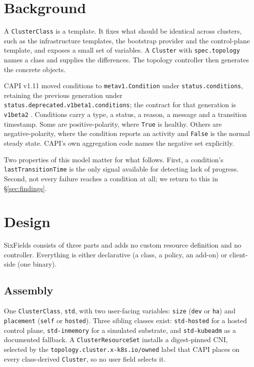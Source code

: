 \documentclass[conference]{IEEEtran}
\begin{document}
\section{Background}

A \texttt{ClusterClass} is a template. It fixes what should be identical across
clusters, such as the infrastructure templates, the bootstrap provider and the
control-plane template, and exposes a small set of variables. A \texttt{Cluster}
with \texttt{spec.topology} names a class and supplies the differences. The
topology controller then generates the concrete objects.

CAPI v1.11 moved conditions to \texttt{metav1.Condition} under
\texttt{status.conditions}, retaining the previous generation under
\texttt{status.deprecated.v1beta1.conditions}; the contract for that generation is
\texttt{v1beta2} \cite{capicontract}. Conditions carry a type, a status, a reason,
a message and a transition timestamp. Some are positive-polarity, where
\texttt{True} is healthy. Others are negative-polarity, where the condition
reports an activity and \texttt{False} is the normal steady state. CAPI's own
aggregation code names the negative set explicitly.

Two properties of this model matter for what follows. First, a condition's
\texttt{lastTransitionTime} is the only signal available for detecting lack of
progress. Second, not every failure reaches a condition at all; we return to this
in \S\ref{sec:findings}.

\section{Design}

SixFields consists of three parts and adds no custom resource definition and no
controller. Everything is either declarative (a class, a policy, an add-on) or
client-side (one binary).

\subsection{Assembly}

One \texttt{ClusterClass}, \texttt{std}, with two user-facing variables:
\texttt{size} (\texttt{dev} or \texttt{ha}) and \texttt{placement} (\texttt{self}
or \texttt{hosted}). Three sibling classes exist: \texttt{std-hosted} for a hosted
control plane, \texttt{std-inmemory} for a simulated substrate, and
\texttt{std-kubeadm} as a documented fallback. A \texttt{ClusterResourceSet}
installs a digest-pinned CNI, selected by the
\texttt{topology.cluster.x-k8s.io/owned} label that CAPI places on every
class-derived \texttt{Cluster}, so no user field selects it.
\end{document}
